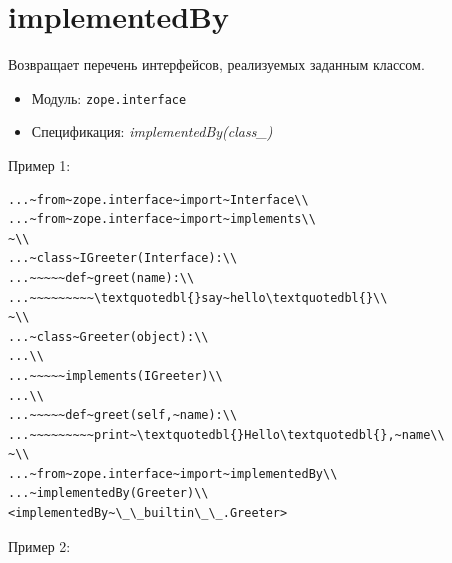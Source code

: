 \documentclass[a4paper,openany,twoside,draft]{book}
\providecommand*{\DUroletitlereference}[1]{\textsl{#1}}
\begin{document}
\section*{implementedBy%
  \label{implementedby}%
}

Возвращает перечень интерфейсов, реализуемых заданным классом.

\begin{itemize}

\item Модуль: \texttt{zope.interface}

\item Спецификация: \DUroletitlereference{implementedBy(class\_)}

\end{itemize}

Пример 1:

\begin{verbatim}
...~from~zope.interface~import~Interface\\
...~from~zope.interface~import~implements\\
~\\
...~class~IGreeter(Interface):\\
...~~~~~def~greet(name):\\
...~~~~~~~~~\textquotedbl{}say~hello\textquotedbl{}\\
~\\
...~class~Greeter(object):\\
...\\
...~~~~~implements(IGreeter)\\
...\\
...~~~~~def~greet(self,~name):\\
...~~~~~~~~~print~\textquotedbl{}Hello\textquotedbl{},~name\\
~\\
...~from~zope.interface~import~implementedBy\\
...~implementedBy(Greeter)\\
<implementedBy~\_\_builtin\_\_.Greeter>
\end{verbatim}

Пример 2:
\end{document}
